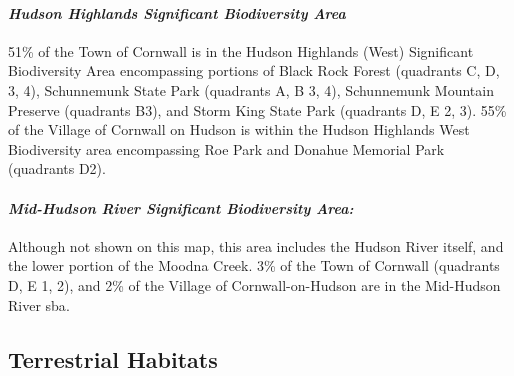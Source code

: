 \paragraph{\textit{Hudson Highlands Significant Biodiversity Area}}51\% of the 
Town of Cornwall is in the Hudson Highlands (West) Significant Biodiversity 
Area encompassing portions of Black Rock Forest (quadrants C, D, \/ 3, 4), 
Schunnemunk State Park (quadrants A, B \/ 3, 4), Schunnemunk Mountain Preserve 
(quadrants B3), and Storm King State Park (quadrants D, E \/ 2, 3). 55\% of the 
Village of Cornwall on Hudson is within the Hudson Highlands West Biodiversity 
area encompassing Roe Park and Donahue Memorial Park (quadrants D2). 

\paragraph{\textit{Mid-Hudson River Significant Biodiversity Area:}} Although not 
shown on this map, this area includes the Hudson River itself, and the lower 
portion of the Moodna Creek. 3\% of the Town of Cornwall (quadrants D, E \/ 1, 
2), and 2\% of the Village of Cornwall-on-Hudson are in the Mid-Hudson River 
\gls{sba}.


\label{map:aok}
\subsection{Terrestrial Habitats}\label{subsec:terrestrialhabitats}
